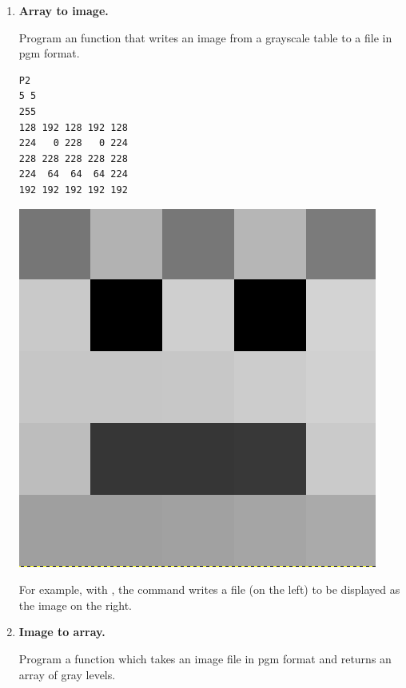 \documentclass[11pt,class=report,crop=false]{standalone}
\begin{document}
\begin{activite}



\begin{enumerate}
  \item \textbf{Array to image.}
  
  Program an  function that writes an image  from a grayscale table to a file in \og{}pgm\fg{} format.
  
\begin{center}
\begin{minipage}{0.3\textwidth}
\begin{lstlisting}
P2
5 5
255
128 192 128 192 128
224   0 228   0 224
228 228 228 228 228 
224  64  64  64 224 
192 192 192 192 192 
\end{lstlisting}
\end{minipage}
\begin{minipage}{0.3\textwidth}
\begin{center}
\includegraphics[scale=\myscale,scale=0.15]{input/ecran-test-pgm}
\end{center}
\end{minipage}
\end{center}
For example, with , the  command writes a  file (on the left) to be displayed as the image on the right.

  
  
  \item \textbf{Image to array.} 
  
  Program a  function 
  which takes an image file in \og{}pgm\fg{} format and returns an array of gray levels.
\end{enumerate}

\end{activite}
\end{document}
